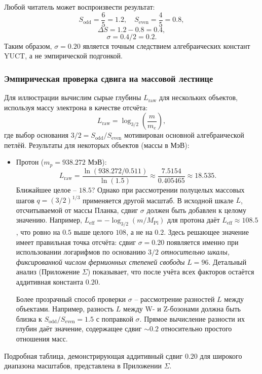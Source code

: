 \documentclass[12pt,a4paper]{article}
\begin{document}
	Любой читатель может воспроизвести результат:
	\[
	S_{\mathrm{odd}} = \frac{6}{5} = 1.2,\quad S_{\mathrm{even}} = \frac{4}{5} = 0.8,
	\]
	\[
	\Delta S = 1.2 - 0.8 = 0.4,
	\]
	\[
	\sigma = 0.4 / 2 = 0.2.
	\]
	Таким образом, \(\sigma = 0.20\) является точным следствием алгебраических констант YUCT, а не эмпирической подгонкой.
	
	\subsubsection{Эмпирическая проверка сдвига на массовой лестнице}
	
	Для иллюстрации вычислим сырые глубины \(L_{\mathrm{raw}}\) для нескольких объектов, используя массу электрона в качестве отсчёта:
	\[
	L_{\mathrm{raw}} = \log_{3/2}\left( \frac{m}{m_e} \right),
	\]
	где выбор основания \(3/2 = S_{\mathrm{odd}}/S_{\mathrm{even}}\) мотивирован основной алгебраической петлёй. Результаты для некоторых объектов (массы в МэВ):
	\begin{itemize}
		\item Протон (\(m_p = 938.272\) МэВ):
		\[
		L_{\mathrm{raw}} = \frac{\ln(938.272 / 0.511)}{\ln(1.5)} \approx \frac{7.5154}{0.405465} \approx 18.535.
		\]
		Ближайшее целое -- \(18.5\)? Однако при рассмотрении полуцелых массовых шагов \(q = (3/2)^{1/3}\) применяется другой масштаб. В исходной шкале \(L\), отсчитываемой от массы Планка, сдвиг \(\sigma\) должен быть добавлен к целому значению. Например, \(L_{\mathrm{eff}} = -\log_{3/2}(m/M_{\mathrm{Pl}})\) для протона даёт \(L_{\mathrm{eff}} \approx 108.5\), что ровно на \(0.5\) выше целого \(108\), а не на \(0.2\). Здесь решающее значение имеет правильная точка отсчёта: сдвиг \(\sigma = 0.20\) появляется именно при использовании логарифмов по основанию \(3/2\) \emph{относительно шкалы, фиксированной числом фермионных степеней свободы} \(L=96\). Детальный анализ (Приложение \(\Sigma\)) показывает, что после учёта всех факторов остаётся аддитивная константа \(0.20\).
		
		Более прозрачный способ проверки \(\sigma\) -- рассмотрение разностей \(L\) между объектами. Например, разность \(L\) между W- и Z-бозонами должна быть близка к \(S_{\mathrm{odd}}/S_{\mathrm{even}} = 1.5\) с поправкой \(\sigma\). Прямое вычисление разности их глубин даёт значение, содержащее сдвиг \(\sim 0.2\) относительно простого отношения масс.
	\end{itemize}
	
	Подробная таблица, демонстрирующая аддитивный сдвиг \(0.20\) для широкого диапазона масштабов, представлена в Приложении \(\Sigma\).
	
\end{document}
